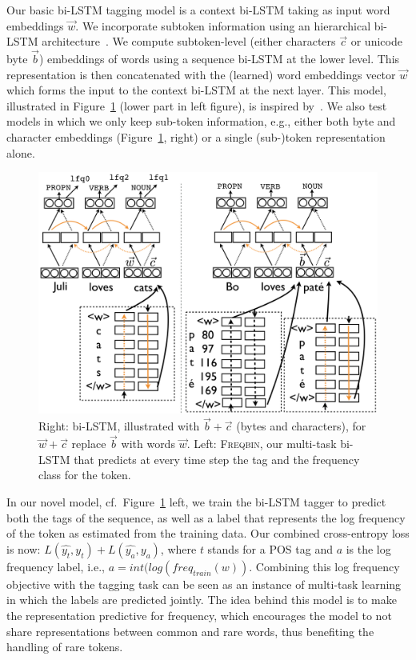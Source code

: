 \documentclass[11pt]{article}
\begin{document}
Our basic bi-LSTM tagging model is a context bi-LSTM taking as input word embeddings $\vec{w}$. 
We incorporate subtoken information using an hierarchical bi-LSTM architecture~\cite{ling:ea:2015,ballesteros:ea:2015}. 
We compute subtoken-level (either characters $\vec{c}$ or unicode byte $\vec{b}$) embeddings of words 
using a sequence bi-LSTM at the lower level. This representation is then concatenated with the (learned) word 
embeddings vector $\vec{w}$ which forms the input to the context bi-LSTM at the next layer. 
This model, illustrated in Figure~\ref{fig:bilstm} (lower part in left figure), is inspired by~. 
We also test models in which we only keep sub-token information, e.g., either both byte and character 
embeddings (Figure~\ref{fig:bilstm}, right) or a single (sub-)token representation alone. %

\begin{figure}[ht!]\centering
\includegraphics[width=1.0\columnwidth]{bilstm2}
\caption{Right: bi-LSTM, illustrated with $\vec{b}+\vec{c}$ (bytes and characters), for $\vec{w}+\vec{c}$  replace $\vec{b}$ with words $\vec{w}$. Left: \textsc{Freqbin}, our multi-task bi-LSTM that predicts at every time step the tag and the frequency class for the token.}
\label{fig:bilstm}
\end{figure}

In our novel model, cf.\ Figure~\ref{fig:bilstm} left, we train the bi-LSTM tagger to predict both the tags of the sequence, as well as a label that represents the  log frequency of the token as estimated from the training data. Our combined cross-entropy loss is now: $L(\hat{y_t},y_t) + L(\hat{y_{a}},y_{a})$, where $t$ stands for a POS tag and $a$ is the log frequency label, i.e., $a=int(log(freq_{train}(w))$.
 Combining this log frequency objective with the tagging task can be seen as an instance of multi-task learning in which the labels are predicted jointly. 
The idea behind this model is to make the representation predictive for frequency, which encourages the model to not share representations between common and rare words, thus benefiting the handling of rare tokens.
\end{document}

